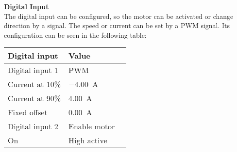 \textbf{Digital Input}\\
The digital input can be configured, so the motor can be activated or change direction by a signal. The speed or current can be set by a PWM signal. Its configuration can be seen in the following table:
\begin{table}[H]
	\begin{tabular}{|l|l|p{4.3cm}|}
		\hline%
		\textbf{Digital input}       &  \textbf{Value}         \\
		\hline%
		Digital input 1                                & PWM           \\
		\hline%
		Current at 10\%							  & \SI{-4,00}{A}              \\
		\hline%
		Current at 90\%							  & \SI{4,00}{A}              \\
		\hline%
		Fixed offset							  & \SI{0,00}{A}              \\
		\hline%
		Digital input 2                                & Enable motor           \\
		\hline%
		On     &  High active       \\
		\hline%
	\end{tabular}
\end{table}

